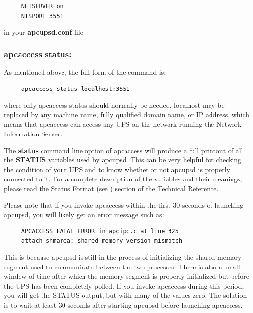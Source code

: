 {{{{\footnotesize
\begin{verbatim}
     NETSERVER on
     NISPORT 3551
\end{verbatim}
\normalsize

in your {\bf apcupsd.conf} file. 

\label{apcaccess-status}

\subsubsection*{apcaccess status:}

\label{index-apcaccess-status-112}
\label{index-status_002c-apcaccess-113}
As mentioned above, the full form of the command is: 

\footnotesize
\begin{verbatim}
     apcaccess status localhost:3551
\end{verbatim}
\normalsize

where only apcaccess status should normally be needed. localhost may be
replaced by any machine name, fully qualified domain name, or IP address,
which means that apcaccess can access any UPS on the network running the
Network Information Server.  

The {\bf status} command line option of apcaccess will produce a full printout
of all the {\bf STATUS} variables used by apcupsd. This can be very helpful
for checking the condition of your UPS and to know whether or not apcupsd is
properly connected to it. For a complete description of the variables and
their meanings, please read the Status Format (see 
) section of
the Technical Reference.  

Please note that if you invoke apcaccess within the first 30 seconds of
launching apcupsd, you will likely get an error message such as: 

\footnotesize
\begin{verbatim}
     APCACCESS FATAL ERROR in apcipc.c at line 325
     attach_shmarea: shared memory version mismatch
\end{verbatim}
\normalsize

This is because apcupsd is still in the process of initializing the shared
memory segment used to communicate between the two processes. There is also a
small window of time after which the memory segment is properly initialized
but before the UPS has been completely polled. If you invoke apcaccess during
this period, you will get the STATUS output, but with many of the values zero.
The solution is to wait at least 30 seconds after starting apcupsd before
launching apcaccess.  

}}}}
